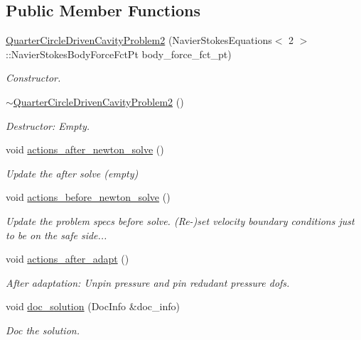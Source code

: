 \subsection*{Public Member Functions}
\begin{DoxyCompactItemize}
\item 
\hyperlink{classQuarterCircleDrivenCavityProblem2_a301f6d2c50e2d266126a80956397d78d}{Quarter\+Circle\+Driven\+Cavity\+Problem2} (Navier\+Stokes\+Equations$<$ 2 $>$\+::Navier\+Stokes\+Body\+Force\+Fct\+Pt body\+\_\+force\+\_\+fct\+\_\+pt)
\begin{DoxyCompactList}\small\item\em Constructor. \end{DoxyCompactList}\item 
\hyperlink{classQuarterCircleDrivenCavityProblem2_afaedf67201056ed5466b139d2bb58d61}{$\sim$\+Quarter\+Circle\+Driven\+Cavity\+Problem2} ()
\begin{DoxyCompactList}\small\item\em Destructor\+: Empty. \end{DoxyCompactList}\item 
void \hyperlink{classQuarterCircleDrivenCavityProblem2_a1417ca3cc4a838d407c8bf85372dfc8f}{actions\+\_\+after\+\_\+newton\+\_\+solve} ()
\begin{DoxyCompactList}\small\item\em Update the after solve (empty) \end{DoxyCompactList}\item 
void \hyperlink{classQuarterCircleDrivenCavityProblem2_aed64247640938ca570da33238e9696ac}{actions\+\_\+before\+\_\+newton\+\_\+solve} ()
\begin{DoxyCompactList}\small\item\em Update the problem specs before solve. (Re-\/)set velocity boundary conditions just to be on the safe side... \end{DoxyCompactList}\item 
void \hyperlink{classQuarterCircleDrivenCavityProblem2_a51d108d18f50d81bad0da998741254a9}{actions\+\_\+after\+\_\+adapt} ()
\begin{DoxyCompactList}\small\item\em After adaptation\+: Unpin pressure and pin redudant pressure dofs. \end{DoxyCompactList}\item 
void \hyperlink{classQuarterCircleDrivenCavityProblem2_a506c1a77cc9a11f586f5cc1b4a252798}{doc\+\_\+solution} (Doc\+Info \&doc\+\_\+info)
\begin{DoxyCompactList}\small\item\em Doc the solution. \end{DoxyCompactList}\end{DoxyCompactItemize}
